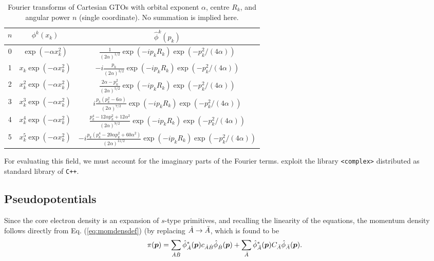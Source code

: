 \begin{table}[ht!]
\begin{center}
\begin{tabular}{||c|c|c||}
\hline
\hline
   $n$ & $\phi^k(x_k)$ & $\hat{\phi}^k(p_k)$\\
\hline
   0 & $\exp(-\alpha x_k^2)$  & $\frac{1}{(2\alpha)^{1/2}}\exp(-ip_kR_k)\exp(-p_k^2/(4\alpha))$ \\
\hline
   1 & $x_k\exp(-\alpha x_k^2)$ & $-i\frac{p_k}{(2\alpha)^{3/2}}\exp(-ip_kR_k)\exp(-p_k^2/(4\alpha))$\\
\hline
   2 & $x_k^2\exp(-\alpha x_k^2)$ & $\frac{2\alpha-p_k^2}{(2\alpha)^{5/2}}\exp(-ip_kR_k)\exp(-p_k^2/(4\alpha))$ \\
\hline
   3 & $x_k^3\exp(-\alpha x_k^2)$ & $i\frac{p_k(p_k^2-6\alpha)}{(2\alpha)^{7/2}}\exp(-ip_kR_k)\exp(-p_k^2/(4\alpha))$ \\
\hline
   4 & $x_k^4\exp(-\alpha x_k^2)$ & $\frac{p_k^4-12\alpha p_k^2+12\alpha^2}{(2\alpha)^{9/2}}\exp(-ip_kR_k)\exp(-p_k^2/(4\alpha))$ \\
   \hline
   5 & $x_k^5\exp(-\alpha x_k^2)$ & $-i\frac{p_k(p_k^4-20\alpha p_k^2+60\alpha^2)}{(2\alpha)^{11/2}}\exp(-ip_kR_k)\exp(-p_k^2/(4\alpha))$ \\
\hline
\hline
\end{tabular}
\caption{Fourier transforms of Cartesian GTOs with orbital exponent $\alpha$, centre $R_k$, and angular power $n$ (single coordinate). No summation is implied here.}\label{tab:momdensang}
\end{center}
\end{table}

For evaluating this field, we must account for the imaginary parts of the Fourier terms. \DTK{} exploit the library \texttt{<complex>} distributed as standard library of \texttt{C++}. 

\subsection{Pseudopotentials}

Since the core electron density is an expansion of $s$-type primitives, and recalling
the linearity of the equations, the momentum density follows directly from Eq.
(\ref{eq:momdensdef}) (by replacing $\dot{A}\to\bar{A}$, which is found to be
%
\begin{equation}%
  \pi(\boldsymbol{p})=\sum_{\dA\dB}
   \hat{\phi}_{\dA}^*(\boldsymbol{p})c_{\dA\dB}\hat{\phi}_{\dB}(\boldsymbol{p})+
   \sum_{\bA}
   \hat{\phi}_{\bA}^*(\boldsymbol{p})C_{\bA}\hat{\phi}_{\bA}(\boldsymbol{p}).
\end{equation}
%


